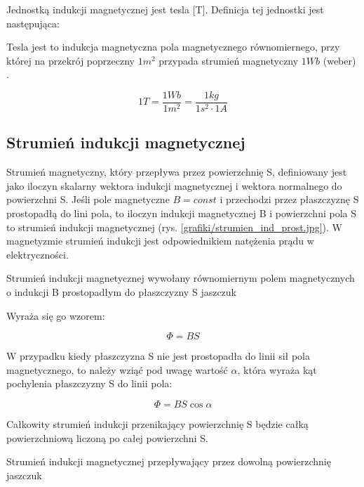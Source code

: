 Jednostką indukcji magnetycznej jest tesla [T]. Definicja tej jednostki jest następująca:

\begin{defn}
	Tesla jest to indukcja magnetyczna pola magnetycznego równomiernego, przy której na przekrój poprzeczny $ 1 m^2 $ przypada strumień magnetyczny $ 1 Wb $ (weber) \cite{kaluszko}.
\end{defn}

\begin{equation} \label{eq:indmag6}
	1 T = \frac{1 Wb}{1 m^2} = \frac{1 kg}{1 s^2 \cdot 1 A}
\end{equation}

\subsection{Strumień indukcji magnetycznej}

Strumień magnetyczny, który przepływa przez powierzchnię S, definiowany jest jako iloczyn skalarny wektora indukcji magnetycznej i wektora normalnego do powierzchni S. Jeśli pole magnetyczne $ B = const $ i przechodzi przez płaszczyznę S prostopadłą do lini pola, to iloczyn indukcji magnetycznej B i powierzchni pola S to strumień indukcji magnetycznej (rys. \ref{grafiki/strumien_ind_prost.jpg}). W magnetyzmie strumień indukcji jest odpowiednikiem natężenia prądu w elektryczności. 

	   {Strumień indukcji magnetycznej wywołany równomiernym polem magnetycznych o indukcji B prostopadłym do płaszczyzny S}
	   {jaszczuk}
	   
Wyraża się go wzorem:

\begin{equation} \label{eq:strindmag1}
	\Phi = B S
\end{equation}

W przypadku kiedy płaszczyzna S nie jest prostopadła do linii sił pola magnetycznego, to należy wziąć pod uwagę wartość $ \alpha $, która wyraża kąt pochylenia płaszczyzny S do linii pola:

\begin{equation} \label{eq:strindmag2}
	\Phi = B S \cos{\alpha}
\end{equation}

Całkowity strumień indukcji przenikający powierzchnię S będzie całką powierzchniową liczoną po całej powierzchni S.

	   {Strumień indukcji magnetycznej przepływający przez dowolną powierzchnię}
	   {jaszczuk}
	   
